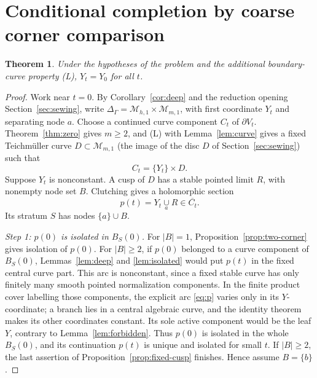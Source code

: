 \documentclass[12pt]{article}
\newcommand{\M}{\mathcal M}
\newcommand{\cl}[1]{\overline{#1}}
\newtheorem{theorem}{Theorem}
\theoremstyle{remark}
\begin{document}
\section{Conditional completion by coarse corner comparison}\label{sec:conditional}

\begin{theorem}\label{thm:conditional}
Under the hypotheses of the problem and the additional
boundary-curve property (L), \(Y_t=Y_0\) for all \(t\).
\end{theorem}

\begin{proof}
Work near \(t=0\). By Corollary~\ref{cor:deep} and the reduction
opening Section~\ref{sec:sewing}, write
\(\Delta_\Gamma=\M_{h,1}\times\M_{m,1}\), with first
coordinate \(Y_t\) and separating node \(a\). Choose a continued curve
component \(C_t\) of \(\partial V_t\). Theorem~\ref{thm:zero} gives
\(m\ge2\), and (L) with Lemma~\ref{lem:curve} gives a fixed
Teichm\"uller curve \(D\subset\M_{m,1}\) (the image of the disc
\(D\) of Section~\ref{sec:sewing}) such that
\begin{equation}\label{eq:Ct}
 C_t=\{Y_t\}\times D.
\end{equation}
Suppose \(Y_t\) is nonconstant. A cusp of \(D\) has a stable
pointed limit \(R\), with nonempty node set \(B\). Clutching
gives a holomorphic section
\begin{equation}\label{eq:p}
 p(t)=Y_t\underset a\cup R\in\cl{C_t}.
\end{equation}
Its stratum \(S\) has nodes \(\{a\}\cup B\).

\emph{Step 1: \(p(0)\) is isolated in \(B_S(0)\).}
For \(|B|=1\), Proposition~\ref{prop:two-corner} gives
isolation of \(p(0)\). For \(|B|\ge2\), if \(p(0)\) belonged
to a curve component of \(B_S(0)\),
Lemmas~\ref{lem:deep} and \ref{lem:isolated} would put
\(p(t)\) in the fixed central curve part. This arc is
nonconstant, since a fixed stable curve has only finitely
many smooth pointed normalization components. In the finite
product cover labelling those components, the explicit arc
\eqref{eq:p} varies only in its \(Y\)-coordinate; a branch lies
in a central algebraic curve, and the identity theorem makes its
other coordinates constant. Its sole active component would be the
leaf \(Y\), contrary to Lemma~\ref{lem:forbidden}.
Thus \(p(0)\) is isolated in the whole \(B_S(0)\), and its
continuation \(p(t)\) is unique and isolated for small
\(t\). If \(|B|\ge2\), the last assertion of
Proposition~\ref{prop:fixed-cusp} finishes. Hence assume \(B=\{b\}\).


\end{proof}
\end{document}
